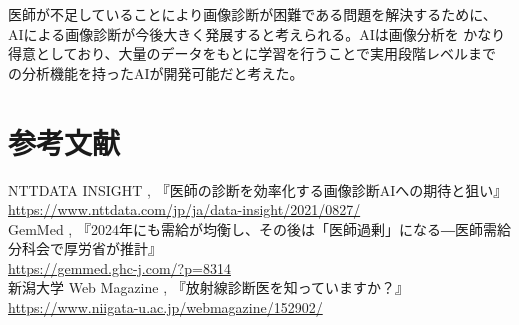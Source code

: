 \documentclass[dvipdfmx,autodetect-engine,titlepage]{jsarticle}
\begin{document}
医師が不足していることにより画像診断が困難である問題を解決するために、
AIによる画像診断が今後大きく発展すると考えられる。AIは画像分析を
かなり得意としており、大量のデータをもとに学習を行うことで実用段階レベルまで
の分析機能を持ったAIが開発可能だと考えた。

\section*{参考文献}

NTTDATA INSIGHT , 『医師の診断を効率化する画像診断AIへの期待と狙い』\\
  \url{https://www.nttdata.com/jp/ja/data-insight/2021/0827/}\\

GemMed , 『2024年にも需給が均衡し、その後は「医師過剰」になる―医師需給分科会で厚労省が推計』\\
\url{https://gemmed.ghc-j.com/?p=8314}\\

新潟大学 Web Magazine , 『放射線診断医を知っていますか？』\\
\url{https://www.niigata-u.ac.jp/webmagazine/152902/}
\end{document}

